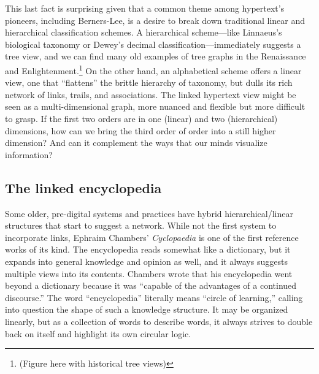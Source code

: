 This last fact is surprising given that a common theme among hypertext's pioneers, including Berners-Lee, is a desire to break down traditional linear and hierarchical classification schemes. A hierarchical scheme---like Linnaeus's biological taxonomy or Dewey's decimal classification---immediately suggests a tree view, and we can find many old examples of tree graphs in the Renaissance and Enlightenment.\footnote{(Figure here with historical tree views)} On the other hand, an alphabetical scheme offers a linear view, one that ``flattens'' the brittle hierarchy of taxonomy, but dulls its rich network of links, trails, and associations. The linked hypertext view might be seen as a multi-dimensional graph, more nuanced and flexible but more difficult to grasp. If the first two orders are in one (linear) and two (hierarchical) dimensions, how can we bring the third order of order into a still higher dimension? And can it complement the ways that our minds visualize information?

\subsection{The linked encyclopedia}

Some older, pre-digital systems and practices have hybrid hierarchical/linear structures that start to suggest a network. While not the first system to incorporate links, Ephraim Chambers' \emph{Cyclopaedia} is one of the first reference works of its kind. The encyclopedia reads somewhat like a dictionary, but it expands into general knowledge and opinion as well, and it always suggests multiple views into its contents. Chambers wrote that his encyclopedia went beyond a dictionary because it was ``capable of the advantages of a continued discourse.''\autocite[64]{chambers_cyclopaedia_1728,yeo_solution_2003} The word ``encyclopedia'' literally means ``circle of learning,'' calling into question the shape of such a knowledge structure. It may be organized linearly, but as a collection of words to describe words, it always strives to double back on itself and highlight its own circular logic.

